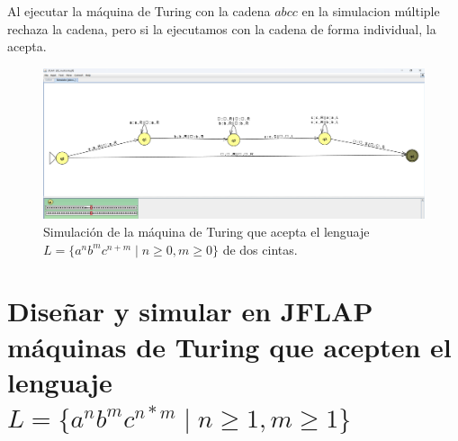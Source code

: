 \documentclass[11pt]{report}
\begin{document}
\begin{itemize}
        Al ejecutar la máquina de Turing con la cadena $abcc$ en la simulacion múltiple
        rechaza la cadena, pero si la ejecutamos con la cadena de forma individual, la
        acepta.
        \begin{figure}[H]
          \centering
          \includegraphics[scale=0.3]{img/MT_02_multiple_ribbon_simulation_2.png}
          \caption{Simulación de la máquina de Turing que acepta el lenguaje $L = \{a^nb^mc^{n+m} \mid n \geq 0, m \geq 0\}$ de dos cintas.}
        \end{figure}
\end{itemize}

\newpage

\section{Diseñar y simular en JFLAP máquinas de Turing que acepten el lenguaje $L = \{a^nb^mc^{n*m} \mid n \geq 1, m \geq 1\}$}

\end{document}
